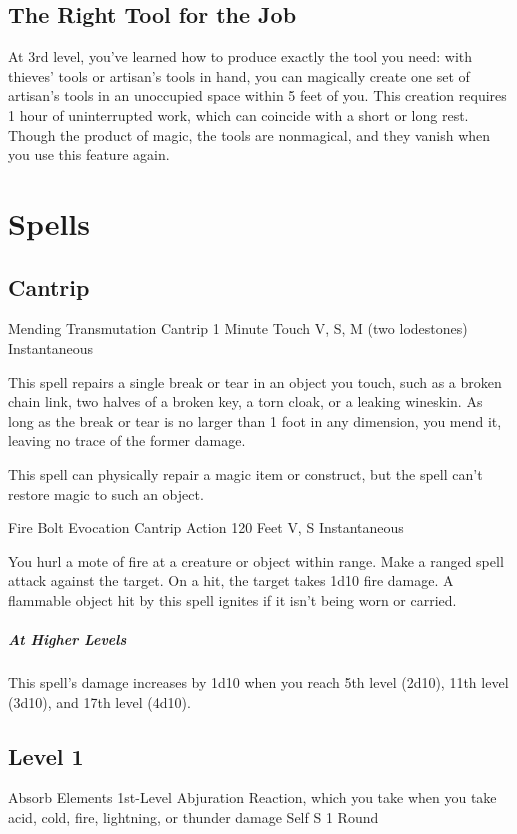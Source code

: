\documentclass[letterpaper,openany,oneside,twocolumn]{book}
\begin{document}
\subsection*{The Right Tool for the Job}
At 3rd level, you've learned how to produce exactly the tool you need: with thieves' tools or artisan's tools in hand, you can magically create one set of artisan's tools in an unoccupied space within 5 feet of you. This creation requires 1 hour of uninterrupted work, which can coincide with a short or long rest. Though the product of magic, the tools are nonmagical, and they vanish when you use this feature again.

\section*{Spells}
\subsection*{Cantrip}

\DndSpellHeader
  {Mending}
  {Transmutation Cantrip}
  {1 Minute}
  {Touch}
  {V, S, M (two lodestones)}
  {Instantaneous}

This spell repairs a single break or tear in an object you touch, such as a broken chain link, two halves of a broken key, a torn cloak, or a leaking wineskin. As long as the break or tear is no larger than 1 foot in any dimension, you mend it, leaving no trace of the former damage.

This spell can physically repair a magic item or construct, but the spell can't restore magic to such an object.

\DndSpellHeader
  {Fire Bolt}
  {Evocation Cantrip}
  {Action}
  {120 Feet}
  {V, S}
  {Instantaneous}

You hurl a mote of fire at a creature or object within range. Make a ranged spell attack against the target. On a hit, the target takes 1d10 fire damage. A flammable object hit by this spell ignites if it isn't being worn or carried.

\subparagraph*{At Higher Levels} This spell's damage increases by 1d10 when you reach 5th level (2d10), 11th level (3d10), and 17th level (4d10).

\subsection*{Level 1}

\DndSpellHeader
  {Absorb Elements}
  {1st-Level Abjuration}
  {Reaction, which you take when you take acid, cold, fire, lightning, or thunder damage}
  {Self}
  {S}
  {1 Round}
\end{document}
